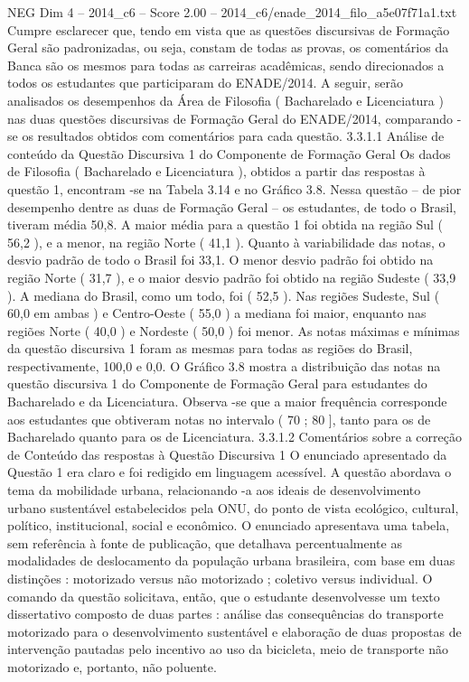 \begin{textsample}{NEG Dim 4 – 2014\_c6 – Score 2.00 – 2014\_c6/enade\_2014\_filo\_a5e07f71a1.txt}
Cumpre esclarecer que, tendo em vista que as questões discursivas de Formação Geral são padronizadas, ou seja, constam de todas as provas, os comentários da Banca são os mesmos para todas as carreiras acadêmicas, sendo direcionados a todos os estudantes que participaram do ENADE/2014.
A seguir, serão analisados os desempenhos da Área de Filosofia ( Bacharelado e Licenciatura ) nas duas questões discursivas de Formação Geral do ENADE/2014, comparando -se os resultados obtidos com comentários para cada questão. 3.3.1.1 Análise de conteúdo da Questão Discursiva 1 do Componente de Formação Geral Os dados de Filosofia ( Bacharelado e Licenciatura ), obtidos a partir das respostas à questão 1, encontram -se na Tabela 3.14 e no Gráfico 3.8.
Nessa questão – de pior desempenho dentre as duas de Formação Geral – os estudantes, de todo o Brasil, tiveram média 50,8.
A maior média para a questão 1 foi obtida na região Sul ( 56,2 ), e a menor, na região Norte ( 41,1 ).
Quanto à variabilidade das notas, o desvio padrão de todo o Brasil foi 33,1.
O menor desvio padrão foi obtido na região Norte ( 31,7 ), e o maior desvio padrão foi obtido na região Sudeste ( 33,9 ).
A mediana do Brasil, como um todo, foi ( 52,5 ).
Nas regiões Sudeste, Sul ( 60,0 em ambas ) e Centro-Oeste ( 55,0 ) a mediana foi maior, enquanto nas regiões Norte ( 40,0 ) e Nordeste ( 50,0 ) foi menor.
As notas máximas e mínimas da questão discursiva 1 foram as mesmas para todas as regiões do Brasil, respectivamente, 100,0 e 0,0.
O Gráfico 3.8 mostra a distribuição das notas na questão discursiva 1 do Componente de Formação Geral para estudantes do Bacharelado e da Licenciatura.
Observa -se que a maior frequência corresponde aos estudantes que obtiveram notas no intervalo ( 70 ; 80 ], tanto para os de Bacharelado quanto para os de Licenciatura. 3.3.1.2 Comentários sobre a correção de Conteúdo das respostas à Questão Discursiva 1 O enunciado apresentado da Questão 1 era claro e foi redigido em linguagem acessível.
A questão abordava o tema da mobilidade urbana, relacionando -a aos ideais de desenvolvimento urbano sustentável estabelecidos pela ONU, do ponto de vista ecológico, cultural, político, institucional, social e econômico.
O enunciado apresentava uma tabela, sem referência à fonte de publicação, que detalhava percentualmente as modalidades de deslocamento da população urbana brasileira, com base em duas distinções : motorizado versus não motorizado ; coletivo versus individual.
O comando da questão solicitava, então, que o estudante desenvolvesse um texto dissertativo composto de duas partes : análise das consequências do transporte motorizado para o desenvolvimento sustentável e elaboração de duas propostas de intervenção pautadas pelo incentivo ao uso da bicicleta, meio de transporte não motorizado e, portanto, não poluente.

\end{textsample}
